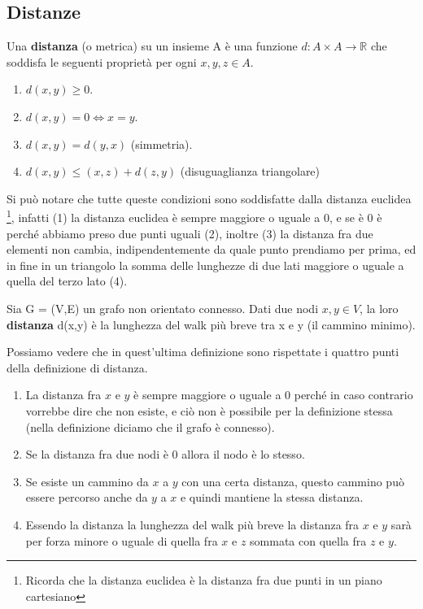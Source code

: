 \subsection{Distanze}
\begin{definition}[Distanza]
    Una \textbf{distanza} (o metrica) su un insieme A è una funzione $d: A \times A \to \mathbb{R}$ che soddisfa le seguenti proprietà per ogni $x,y,z \in A$.
    \begin{enumerate}
        \item $d(x,y) \geq 0$.
        \item $d(x,y) = 0 \Longleftrightarrow x = y$.
        \item $d(x,y) = d(y,x)$ (simmetria).
        \item $d(x,y) \leq (x,z) + d(z,y)$ (disuguaglianza triangolare)
    \end{enumerate}
\end{definition}
Si può notare che tutte queste condizioni sono soddisfatte dalla distanza euclidea \footnote{Ricorda che la distanza euclidea è la distanza fra due punti in un piano cartesiano}, infatti (1) la distanza euclidea è sempre maggiore o uguale a 0, e se è 0 è perché abbiamo preso due punti uguali (2), inoltre (3) la distanza fra due elementi non cambia, indipendentemente da quale punto prendiamo per prima, ed in fine in un triangolo la somma delle lunghezze di due lati  maggiore o uguale a quella del terzo lato (4).

\begin{definition}
    Sia G = (V,E) un grafo non orientato connesso. Dati due nodi $x,y \in V$, la loro \textbf{distanza} d(x,y) è la lunghezza del walk più breve tra x e y (il cammino minimo).
\end{definition}
Possiamo vedere che in quest'ultima definizione sono rispettate i quattro punti della definizione di distanza.
\begin{enumerate}
    \item La distanza fra $x$ e $y$ è sempre maggiore o uguale a 0 perché in caso contrario vorrebbe dire che non esiste, e ciò non è possibile per la definizione stessa (nella definizione diciamo che il grafo è connesso).
    \item Se la distanza fra due nodi è 0 allora il nodo è lo stesso.
    \item Se esiste un cammino da $x$ a $y$ con una certa distanza, questo cammino può essere percorso anche da $y$ a $x$ e quindi mantiene la stessa distanza.
    \item Essendo la distanza la lunghezza del walk più breve la distanza fra $x$ e $y$ sarà per forza minore o uguale di quella fra $x$ e $z$ sommata con quella fra $z$ e $y$.
\end{enumerate}

